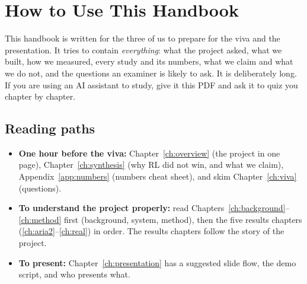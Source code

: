\chapter*{How to Use This Handbook}

This handbook is written for the three of us to prepare for the viva and the presentation. It tries to contain \emph{everything}: what the project asked, what we built, how we measured, every study and its numbers, what we claim and what we do not, and the questions an examiner is likely to ask. It is deliberately long. If you are using an AI assistant to study, give it this PDF and ask it to quiz you chapter by chapter.

\section*{Reading paths}
\begin{itemize}
\item \textbf{One hour before the viva:} Chapter~\ref{ch:overview} (the project in one page), Chapter~\ref{ch:synthesis} (why RL did not win, and what we claim), Appendix~\ref{app:numbers} (numbers cheat sheet), and skim Chapter~\ref{ch:viva} (questions).
\item \textbf{To understand the project properly:} read Chapters~\ref{ch:background}--\ref{ch:method} first (background, system, method), then the five results chapters (\ref{ch:aria2}--\ref{ch:real}) in order. The results chapters follow the story of the project.
\item \textbf{To present:} Chapter~\ref{ch:presentation} has a suggested slide flow, the demo script, and who presents what.
\end{itemize}

